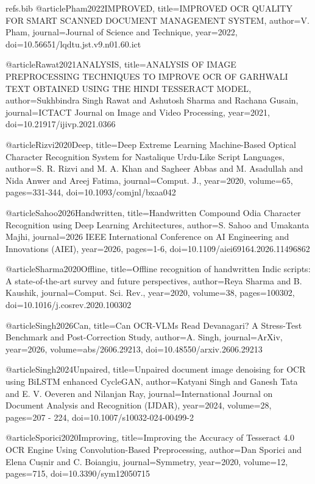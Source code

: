 \begin{filecontents}{refs.bib}
    @article{Pham2022IMPROVED,
    title={IMPROVED OCR QUALITY FOR SMART SCANNED DOCUMENT MANAGEMENT SYSTEM},
    author={V. Pham},
    journal={Journal of Science and Technique},
    year={2022},
    doi={10.56651/lqdtu.jst.v9.n01.60.ict}
    }
    
    @article{Rawat2021ANALYSIS,
    title={ANALYSIS OF IMAGE PREPROCESSING TECHNIQUES TO IMPROVE OCR OF GARHWALI TEXT OBTAINED USING THE HINDI TESSERACT MODEL},
    author={Sukhbindra Singh Rawat and Ashutosh Sharma and Rachana Gusain},
    journal={ICTACT Journal on Image and Video Processing},
    year={2021},
    doi={10.21917/ijivp.2021.0366}
    }
    
    @article{Rizvi2020Deep,
    title={Deep Extreme Learning Machine-Based Optical Character Recognition System for Nastalique Urdu-Like Script Languages},
    author={S. R. Rizvi and M. A. Khan and Sagheer Abbas and M. Asadullah and Nida Anwer and Areej Fatima},
    journal={Comput. J.},
    year={2020},
    volume={65},
    pages={331-344},
    doi={10.1093/comjnl/bxaa042}
    }
    
    @article{Sahoo2026Handwritten,
    title={Handwritten Compound Odia Character Recognition using Deep Learning Architectures},
    author={S. Sahoo and Umakanta Majhi},
    journal={2026 IEEE International Conference on AI Engineering and Innovations (AIEI)},
    year={2026},
    pages={1-6},
    doi={10.1109/aiei69164.2026.11496862}
    }
    
    @article{Sharma2020Offline,
    title={Offline recognition of handwritten Indic scripts: A state-of-the-art survey and future perspectives},
    author={Reya Sharma and B. Kaushik},
    journal={Comput. Sci. Rev.},
    year={2020},
    volume={38},
    pages={100302},
    doi={10.1016/j.cosrev.2020.100302}
    }
    
    @article{Singh2026Can,
    title={Can OCR-VLMs Read Devanagari? A Stress-Test Benchmark and Post-Correction Study},
    author={A. Singh},
    journal={ArXiv},
    year={2026},
    volume={abs/2606.29213},
    doi={10.48550/arxiv.2606.29213}
    }
    
    @article{Singh2024Unpaired,
    title={Unpaired document image denoising for OCR using BiLSTM enhanced CycleGAN},
    author={Katyani Singh and Ganesh Tata and E. V. Oeveren and Nilanjan Ray},
    journal={International Journal on Document Analysis and Recognition (IJDAR)},
    year={2024},
    volume={28},
    pages={207 - 224},
    doi={10.1007/s10032-024-00499-2}
    }
    
    @article{Sporici2020Improving,
    title={Improving the Accuracy of Tesseract 4.0 OCR Engine Using Convolution-Based Preprocessing},
    author={Dan Sporici and Elena Cușnir and C. Boiangiu},
    journal={Symmetry},
    year={2020},
    volume={12},
    pages={715},
    doi={10.3390/sym12050715}
    }
    

\end{filecontents}
